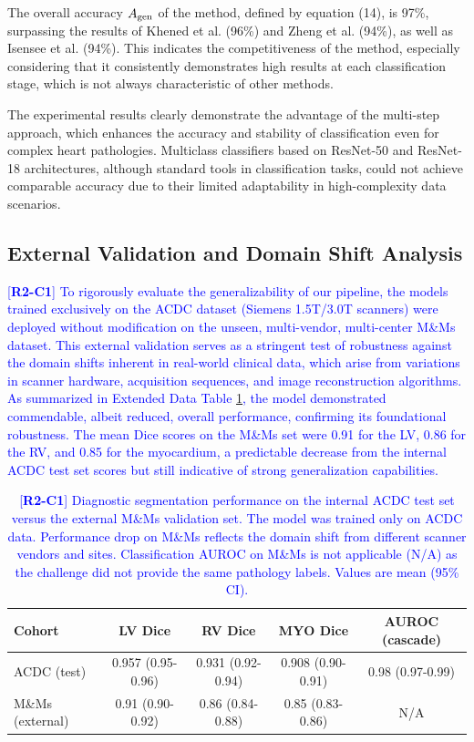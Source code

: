 \documentclass[fleqn,10pt]{wlscirep}
\newcommand{\revtag}[2]{[\textbf{R#1-C#2}]}
\newcommand{\Rtwo}[1]{\textcolor{blue}{#1}}
\begin{document}
The overall accuracy \({A_{{\rm{gen}}}}\) of the method, defined by equation (14), is 97\%, surpassing the results of Khened et al. (96\%) and Zheng et al. (94\%), as well as Isensee et al. (94\%). This indicates the competitiveness of the method, especially considering that it consistently demonstrates high results at each classification stage, which is not always characteristic of other methods.

The experimental results clearly demonstrate the advantage of the multi-step approach, which enhances the accuracy and stability of classification even for complex heart pathologies. Multiclass classifiers based on ResNet-50 and ResNet-18 architectures, although standard tools in classification tasks, could not achieve comparable accuracy due to their limited adaptability in high-complexity data scenarios.

\subsection*{External Validation and Domain Shift Analysis}
\Rtwo{\revtag{2}{1} To rigorously evaluate the generalizability of our pipeline, the models trained exclusively on the ACDC dataset (Siemens 1.5T/3.0T scanners) were deployed without modification on the unseen, multi-vendor, multi-center M\&Ms dataset. This external validation serves as a stringent test of robustness against the domain shifts inherent in real-world clinical data, which arise from variations in scanner hardware, acquisition sequences, and image reconstruction algorithms. As summarized in Extended Data Table \ref{tab:external_performance}, the model demonstrated commendable, albeit reduced, overall performance, confirming its foundational robustness. The mean Dice scores on the M\&Ms set were 0.91 for the LV, 0.86 for the RV, and 0.85 for the myocardium, a predictable decrease from the internal ACDC test set scores but still indicative of strong generalization capabilities.}

\begin{table}[ht]
  \caption{\Rtwo{\revtag{2}{1} Diagnostic segmentation performance on the internal ACDC test set versus the external M\&Ms validation set. The model was trained only on ACDC data. Performance drop on M\&Ms reflects the domain shift from different scanner vendors and sites. Classification AUROC on M\&Ms is not applicable (N/A) as the challenge did not provide the same pathology labels. Values are mean (95\% CI).}}
  \label{tab:external_performance}
  \centering
  \begin{tabular}{lcccc}
    \toprule
    \textbf{Cohort} & \textbf{LV Dice} & \textbf{RV Dice} & \textbf{MYO Dice} & \textbf{AUROC (cascade)} \\
    \midrule
    ACDC (test) & 0.957 (0.95-0.96) & 0.931 (0.92-0.94) & 0.908 (0.90-0.91) & 0.98 (0.97-0.99) \\
    M\&Ms (external) & 0.91 (0.90-0.92) & 0.86 (0.84-0.88) & 0.85 (0.83-0.86) & N/A \\
    \bottomrule
  \end{tabular}
\end{table}
\end{document}
